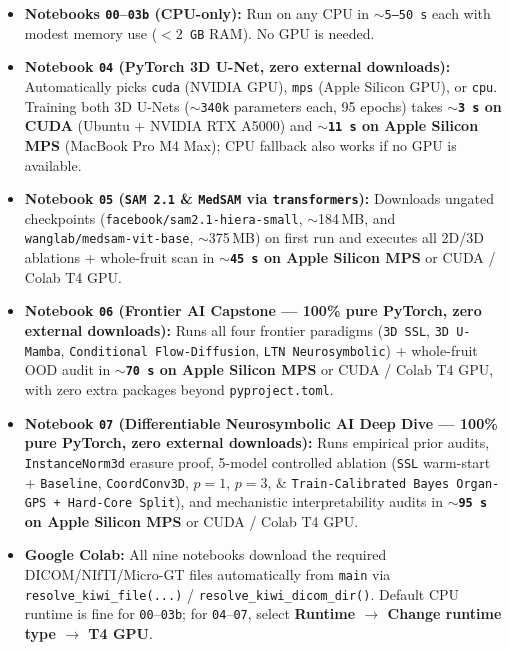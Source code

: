 \documentclass[10pt,a4paper]{article}
\begin{document}
\begin{infobox}
\begin{itemize}
    \item \textbf{Notebooks \texttt{00}--\texttt{03b} (CPU-only):} Run on any CPU in \texttt{$\sim$5--50\,s} each with modest memory use (\texttt{$< 2$\,GB} RAM). No GPU is needed.
    \item \textbf{Notebook \texttt{04} (PyTorch 3D U-Net, zero external downloads):} Automatically picks \texttt{cuda} (NVIDIA GPU), \texttt{mps} (Apple Silicon GPU), or \texttt{cpu}. Training both 3D U-Nets (\texttt{$\sim$340k} parameters each, 95 epochs) takes \textbf{\texttt{$\sim$3\,s} on CUDA} (Ubuntu + NVIDIA RTX A5000) and \textbf{\texttt{$\sim$11\,s} on Apple Silicon MPS} (MacBook Pro M4 Max); CPU fallback also works if no GPU is available.
    \item \textbf{Notebook \texttt{05} (\texttt{SAM 2.1} \& \texttt{MedSAM} via \texttt{transformers}):} Downloads ungated checkpoints (\texttt{facebook/sam2.1-hiera-small}, $\sim$184\,MB, and \texttt{wanglab/medsam-vit-base}, $\sim$375\,MB) on first run and executes all 2D/3D ablations + whole-fruit scan in \textbf{\texttt{$\sim$45\,s} on Apple Silicon MPS} or CUDA / Colab T4 GPU.
    \item \textbf{Notebook \texttt{06} (Frontier AI Capstone --- 100\% pure PyTorch, zero external downloads):} Runs all four frontier paradigms (\texttt{3D SSL}, \texttt{3D U-Mamba}, \texttt{Conditional Flow-Diffusion}, \texttt{LTN Neurosymbolic}) + whole-fruit OOD audit in \textbf{\texttt{$\sim$70\,s} on Apple Silicon MPS} or CUDA / Colab T4 GPU, with zero extra packages beyond \texttt{pyproject.toml}.
    \item \textbf{Notebook \texttt{07} (Differentiable Neurosymbolic AI Deep Dive --- 100\% pure PyTorch, zero external downloads):} Runs empirical prior audits, \texttt{InstanceNorm3d} erasure proof, 5-model controlled ablation (\texttt{SSL} warm-start + \texttt{Baseline}, \texttt{CoordConv3D}, $p=1$, $p=3$, \& \texttt{Train-Calibrated Bayes Organ-GPS + Hard-Core Split}), and mechanistic interpretability audits in \textbf{\texttt{$\sim$95\,s} on Apple Silicon MPS} or CUDA / Colab T4 GPU.
    \item \textbf{Google Colab:} All nine notebooks download the required DICOM/NIfTI/Micro-GT files automatically from \texttt{main} via \texttt{resolve\_kiwi\_file(...)} / \texttt{resolve\_kiwi\_dicom\_dir()}. Default CPU runtime is fine for \texttt{00}--\texttt{03b}; for \texttt{04}--\texttt{07}, select \textbf{Runtime $\to$ Change runtime type $\to$ T4 GPU}.
\end{itemize}
\end{infobox}
\end{document}
